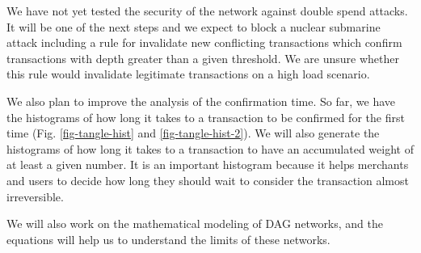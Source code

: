 We have not yet tested the security of the network against double spend attacks. It will be one of the next steps and we expect to block a nuclear submarine attack including a rule for invalidate new conflicting transactions which confirm transactions with depth greater than a given threshold. We are unsure whether this rule would invalidate legitimate transactions on a high load scenario.

We also plan to improve the analysis of the confirmation time. So far, we have the histograms of how long it takes to a transaction to be confirmed for the first time (Fig. \ref{fig-tangle-hist} and \ref{fig-tangle-hist-2}). We will also generate the histograms of how long it takes to a transaction to have an accumulated weight of at least a given number. It is an important histogram because it helps merchants and users to decide how long they should wait to consider the transaction almost irreversible.

We will also work on the mathematical modeling of DAG networks, and the equations will help us to understand the limits of these networks.
